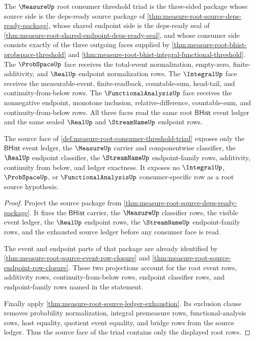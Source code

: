 \begin{definition}
\label{def:measure-root-consumer-threshold-triad}
The $\MeasureUp$ root consumer threshold triad is the three-sided package
whose source side is the deps-ready source package of
\autoref{thm:measure-root-source-deps-ready-package}, whose shared endpoint
side is the deps-ready seal of
\autoref{thm:measure-root-shared-endpoint-deps-ready-seal}, and whose
consumer side consists exactly of the three outgoing faces supplied by
\autoref{thm:measure-root-bhist-probspace-threshold} and
\autoref{thm:measure-root-bhist-integral-functional-threshold}. The
$\ProbSpaceUp$ face receives the total-event normalization, empty-zero,
finite-additivity, and $\RealUp$ endpoint normalization rows. The
$\IntegralUp$ face receives the measurable-event, finite-readback,
countable-sum, head-tail, and continuity-from-below rows. The
$\FunctionalAnalysisUp$ face receives the nonnegative endpoint, monotone
inclusion, relative-difference, countable-sum, and continuity-from-below rows.
All three faces read the same root $\mathsf{BHist}$ event ledger and the same
sealed $\RealUp$ and $\StreamNameUp$ endpoint rows.
\end{definition}

\begin{theorem}
\label{thm:measure-root-source-threshold-triad-face}
The source face of
\autoref{def:measure-root-consumer-threshold-triad} exposes only the
$\mathsf{BHist}$ event ledger, the $\MeasureUp$ carrier and componentwise
classifier, the $\RealUp$ endpoint classifier, the $\StreamNameUp$
endpoint-family rows, additivity, continuity from below, and ledger exactness.
It exposes no $\IntegralUp$, $\ProbSpaceUp$, or $\FunctionalAnalysisUp$
consumer-specific row as a root source hypothesis.
\end{theorem}
\begin{proof}
Project the source package from
\autoref{thm:measure-root-source-deps-ready-package}. It fixes the
$\mathsf{BHist}$ carrier, the $\MeasureUp$ classifier rows, the visible event
ledger, the $\RealUp$ endpoint rows, the $\StreamNameUp$ endpoint-family rows,
and the exhausted source ledger before any consumer face is read.

The event and endpoint parts of that package are already identified by
\autoref{thm:measure-root-source-event-row-closure} and
\autoref{thm:measure-root-source-endpoint-row-closure}. These two projections
account for the root event rows, additivity rows, continuity-from-below rows,
endpoint classifier rows, and endpoint-family rows named in the statement.

Finally apply \autoref{thm:measure-root-source-ledger-exhaustion}. Its
exclusion clause removes probability normalization, integral premeasure rows,
functional-analysis rows, host equality, quotient event equality, and bridge
rows from the source ledger. Thus the source face of the triad contains only
the displayed root rows.
\end{proof}

